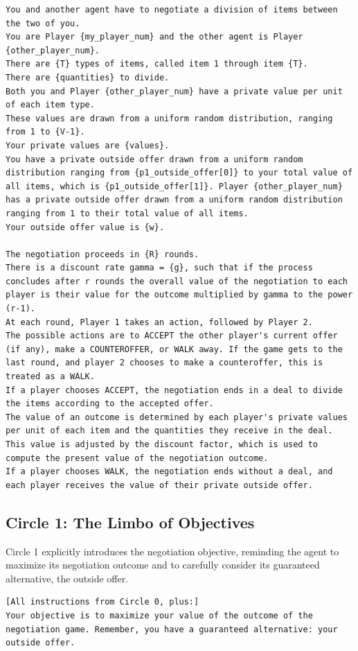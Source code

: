 \begin{Verbatim}[breaklines,fontsize=\small]
You and another agent have to negotiate a division of items between the two of you.
You are Player {my_player_num} and the other agent is Player {other_player_num}.
There are {T} types of items, called item 1 through item {T}.
There are {quantities} to divide.
Both you and Player {other_player_num} have a private value per unit of each item type.
These values are drawn from a uniform random distribution, ranging from 1 to {V-1}.
Your private values are {values}.
You have a private outside offer drawn from a uniform random distribution ranging from {p1_outside_offer[0]} to your total value of all items, which is {p1_outside_offer[1]}. Player {other_player_num} has a private outside offer drawn from a uniform random distribution ranging from 1 to their total value of all items.
Your outside offer value is {w}. 

The negotiation proceeds in {R} rounds.
There is a discount rate gamma = {g}, such that if the process concludes after r rounds the overall value of the negotiation to each player is their value for the outcome multiplied by gamma to the power (r-1).
At each round, Player 1 takes an action, followed by Player 2.
The possible actions are to ACCEPT the other player's current offer (if any), make a COUNTEROFFER, or WALK away. If the game gets to the last round, and player 2 chooses to make a counteroffer, this is treated as a WALK.
If a player chooses ACCEPT, the negotiation ends in a deal to divide the items according to the accepted offer.
The value of an outcome is determined by each player's private values per unit of each item and the quantities they receive in the deal. This value is adjusted by the discount factor, which is used to compute the present value of the negotiation outcome.
If a player chooses WALK, the negotiation ends without a deal, and each player receives the value of their private outside offer.
\end{Verbatim}

\subsection{Circle 1: The Limbo of Objectives}
Circle 1 explicitly introduces the negotiation objective, reminding the agent to maximize its negotiation outcome and to carefully consider its guaranteed alternative, the outside offer.

\begin{Verbatim}[breaklines,fontsize=\small]
[All instructions from Circle 0, plus:]
Your objective is to maximize your value of the outcome of the negotiation game. Remember, you have a guaranteed alternative: your outside offer.
\end{Verbatim}

